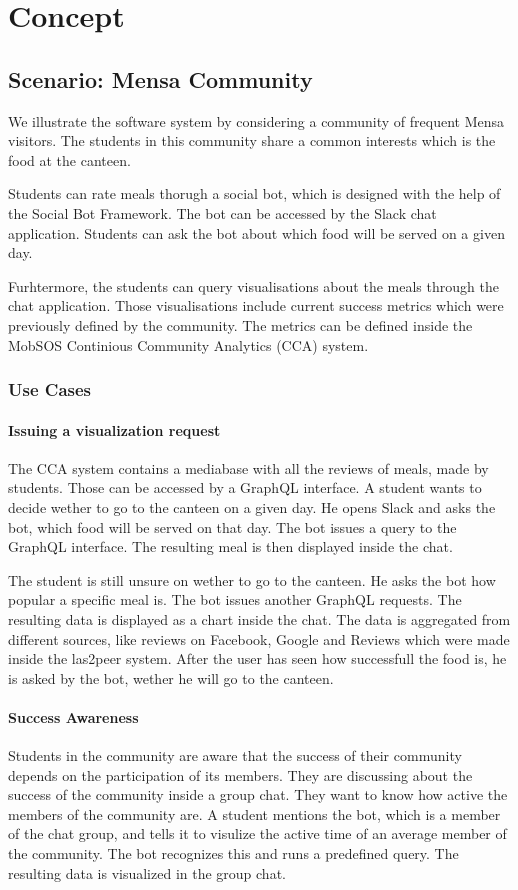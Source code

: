 \chapter{Concept}
\section{Scenario: Mensa Community}
We illustrate the software system by considering a community of frequent Mensa visitors. The students in this community share a common interests which is the food at the canteen.

Students can rate meals thorugh a social bot, which is designed with the help of the Social Bot Framework. The bot can be accessed by the Slack chat application. Students can ask the bot about which food will be served on a given day.

Furhtermore, the students can query visualisations about the meals through the chat application. Those visualisations include current success metrics which were previously defined by the community. The metrics can be defined inside the MobSOS Continious Community Analytics (CCA) system.

\subsection{Use Cases}

\subsubsection{Issuing a visualization request} The CCA system contains a mediabase with all the reviews of meals, made by students. Those can be accessed by a GraphQL interface. A student wants to decide wether to go to the canteen on a given day. He opens Slack and asks the bot, which food will be served on that day. The bot issues a query to the GraphQL interface. The resulting meal is then displayed inside the chat.

The student is still unsure on wether to go to the canteen. He asks the bot how popular a specific meal is. The bot issues another GraphQL requests. The resulting data is displayed as a chart inside the chat. The data is aggregated from different sources, like reviews on Facebook, Google and Reviews which were made inside the las2peer system. After the user has seen how successfull the food is, he is asked by the bot, wether he will go to the canteen.

\subsubsection{Success Awareness} Students in the community are aware that the success of their community depends on the participation of its members. They are discussing about the success of the community inside a group chat. They want to know how active the members of the community are. A student  mentions the bot, which is a member of the chat group, and tells it to visulize the active time of an average member of the community. The bot recognizes this and runs a predefined query. The resulting data is visualized in the group chat.

